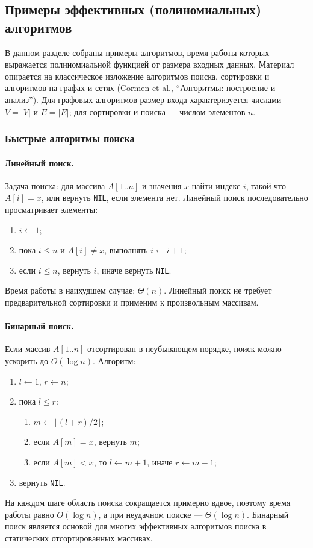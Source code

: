 \documentclass[a4paper,12pt]{article}
\begin{document}
\subsection{Примеры эффективных (полиномиальных) алгоритмов}

В данном разделе собраны примеры алгоритмов, время работы которых выражается полиномиальной функцией от размера входных данных. Материал опирается на классическое изложение алгоритмов поиска, сортировки и алгоритмов на графах и сетях (Cormen et al., ``Алгоритмы: построение и анализ''). Для графовых алгоритмов размер входа характеризуется числами \(V=|V|\) и \(E=|E|\); для сортировки и поиска — числом элементов \(n\).

\subsubsection*{Быстрые алгоритмы поиска}

\paragraph*{Линейный поиск.}
Задача поиска: для массива \(A[1..n]\) и значения \(x\) найти индекс \(i\), такой что \(A[i]=x\), или вернуть \texttt{NIL}, если элемента нет. Линейный поиск последовательно просматривает элементы:
\begin{enumerate}
    \item \(i\leftarrow 1\);
    \item пока \(i\le n\) и \(A[i]\ne x\), выполнять \(i\leftarrow i+1\);
    \item если \(i\le n\), вернуть \(i\), иначе вернуть \texttt{NIL}.
\end{enumerate}
Время работы в наихудшем случае: \(\Theta(n)\). Линейный поиск не требует предварительной сортировки и применим к произвольным массивам.

\paragraph*{Бинарный поиск.}
Если массив \(A[1..n]\) отсортирован в неубывающем порядке, поиск можно ускорить до \(O(\log n)\). Алгоритм:
\begin{enumerate}
    \item \(l\leftarrow 1\), \(r\leftarrow n\);
    \item пока \(l\le r\):
    \begin{enumerate}
        \item \(m\leftarrow \lfloor(l+r)/2\rfloor\);
        \item если \(A[m]=x\), вернуть \(m\);
        \item если \(A[m]<x\), то \(l\leftarrow m+1\), иначе \(r\leftarrow m-1\);
    \end{enumerate}
    \item вернуть \texttt{NIL}.
\end{enumerate}
На каждом шаге область поиска сокращается примерно вдвое, поэтому время работы равно \(O(\log n)\), а при неудачном поиске — \(\Theta(\log n)\). Бинарный поиск является основой для многих эффективных алгоритмов поиска в статических отсортированных массивах.
\end{document}
